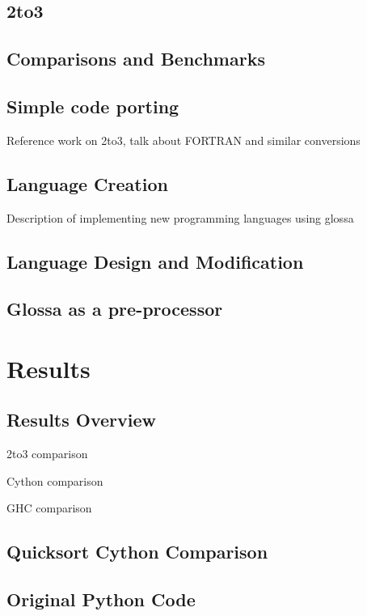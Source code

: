 \documentclass{article}
\begin{document}
\subsection{2to3}

\subsection{Comparisons and Benchmarks}

\subsection{Simple code porting}
Reference work on 2to3, talk about FORTRAN and similar conversions

\subsection{Language Creation}
Description of implementing new programming languages using glossa

\subsection{Language Design and Modification}
\subsection{Glossa as a pre-processor}

\section{Results}

\subsection{Results Overview}

2to3 comparison

Cython comparison

GHC comparison

\subsection{Quicksort Cython Comparison}

\newpage
\subsection{Original Python Code}
\end{document}
